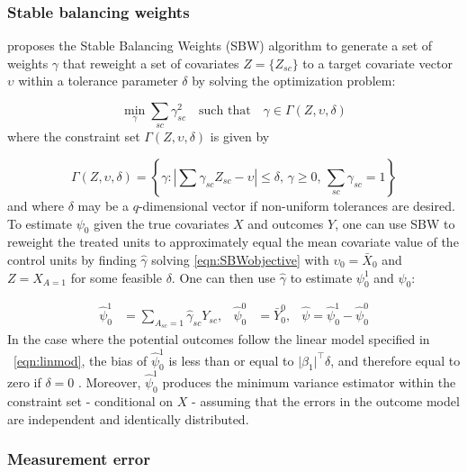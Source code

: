 \documentclass[aoas]{imsart}
\theoremstyle{plain}
\theoremstyle{remark}
\begin{document}
\subsubsection{Stable balancing weights}\label{ssec:SBW}

\cite{zubizarreta2015stable} proposes the Stable Balancing Weights (SBW) algorithm to generate a set of weights $\gamma$ that reweight a set of covariates $Z = \{Z_{sc}\}$ to a target covariate vector $\upsilon$ within a tolerance parameter $\delta$ by solving the optimization problem:

\begin{equation}\label{eqn:SBWobjective}
 \min_{\gamma} \sum_{sc} \gamma_{sc}^2 \quad \text{such that} \quad \gamma \in \Gamma(Z, \upsilon, \delta)
\end{equation}
%
where the constraint set $\Gamma(Z, \upsilon, \delta)$ is given by

\[ \Gamma(Z, \upsilon, \delta) = \left\{\gamma: \left|\sum \gamma_{sc} Z_{sc}  - \upsilon\right| \leq \delta,\, \gamma \geq 0,\, \sum_{sc} \gamma_{sc} = 1\right\}\]
%
and where $\delta$ may be a $q$-dimensional vector if non-uniform tolerances are desired. To estimate $\psi_0$ given the true covariates $X$ and outcomes $Y$, one can use SBW to reweight the treated units to approximately equal the mean covariate value of the control units by finding $\hat{\gamma}$ solving \eqref{eqn:SBWobjective} with $\upsilon_0 = \bar{X}_0$ and $Z = X_{A=1}$ for some feasible $\delta$. One can then use $\hat{\gamma}$ to estimate $\psi_0^1$ and $\psi_0$:

\begin{align}\label{eqn:estimators}
\hat{\psi}_0^1 &= \sum_{A_{sc}=1} \hat{\gamma}_{sc} Y_{sc}, & \hat{\psi}_0^0 & = \bar{Y}_0^0, & \hat{\psi} = \hat{\psi}_0^1 - \hat{\psi}_0^0
\end{align}
%
In the case where the potential outcomes follow the linear model specified in ~\eqref{eqn:linmod}, the bias of $\hat{\psi}^1_0$ is less than or equal to $\lvert\beta_1\rvert^\top\delta$, and therefore equal to zero if $\delta = 0$ \citep{zubizarreta2015stable}. Moreover, $\hat{\psi}_0^1$ produces the minimum variance estimator within the constraint set - conditional on $X$ - assuming that the errors in the outcome model are independent and identically distributed.

\subsubsection{Measurement error}\label{ssec:methodsmsrment} 
\end{document}
